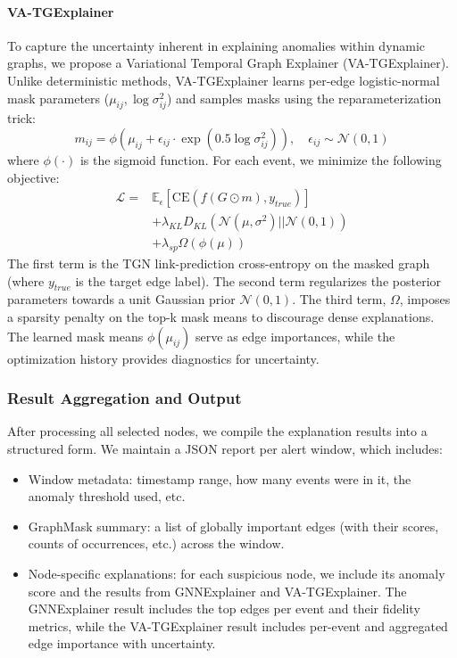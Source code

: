 \documentclass[conference]{IEEEtran}
\begin{document}
\paragraph{VA-TGExplainer}
To capture the uncertainty inherent in explaining anomalies within dynamic graphs, we propose a Variational Temporal Graph Explainer (VA-TGExplainer). Unlike deterministic methods, VA-TGExplainer learns per-edge logistic-normal mask parameters ($\mu_{ij}, \log \sigma^2_{ij}$) and samples masks using the reparameterization trick:
\begin{equation}
    m_{ij} = \phi(\mu_{ij} + \epsilon_{ij} \cdot \exp(0.5 \log \sigma^2_{ij})), \quad \epsilon_{ij} \sim \mathcal{N}(0,1)
\end{equation}
where $\phi(\cdot)$ is the sigmoid function. For each event, we minimize the following objective:
\begin{equation}
\begin{split}
    \mathcal{L} = &\mathbb{E}_{\epsilon}[\text{CE}(f(G \odot m), y_{true})] \\
    &+ \lambda_{KL} D_{KL}(\mathcal{N}(\mu, \sigma^2) || \mathcal{N}(0, 1)) \\
    &+ \lambda_{sp} \Omega(\phi(\mu))
\end{split}
\end{equation}
The first term is the TGN link-prediction cross-entropy on the masked graph (where $y_{true}$ is the target edge label). The second term regularizes the posterior parameters towards a unit Gaussian prior $\mathcal{N}(0, 1)$. The third term, $\Omega$, imposes a sparsity penalty on the top-k mask means to discourage dense explanations. The learned mask means $\phi(\mu_{ij})$ serve as edge importances, while the optimization history provides diagnostics for uncertainty.

\subsubsection{Result Aggregation and Output}
After processing all selected nodes, we compile the explanation results into a structured form. We maintain a JSON report per alert window, which includes:
\begin{itemize}
    \item Window metadata: timestamp range, how many events were in it, the anomaly threshold used, etc.
    \item GraphMask summary: a list of globally important edges (with their scores, counts of occurrences, etc.) across the window.
    \item Node-specific explanations: for each suspicious node, we include its anomaly score and the results from GNNExplainer and VA-TGExplainer. The GNNExplainer result includes the top edges per event and their fidelity metrics, while the VA-TGExplainer result includes per-event and aggregated edge importance with uncertainty.
\end{itemize}
\end{document}
